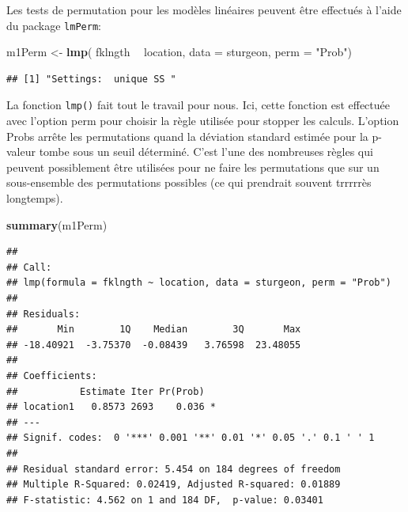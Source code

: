 \documentclass[12pt,]{book}
\newenvironment{Shaded}{\begin{snugshade}}{\end{snugshade}}
\newcommand{\DataTypeTok}[1]{\textcolor[rgb]{0.13,0.29,0.53}{#1}}
\newcommand{\KeywordTok}[1]{\textcolor[rgb]{0.13,0.29,0.53}{\textbf{#1}}}
\newcommand{\NormalTok}[1]{#1}
\newcommand{\OperatorTok}[1]{\textcolor[rgb]{0.81,0.36,0.00}{\textbf{#1}}}
\newcommand{\StringTok}[1]{\textcolor[rgb]{0.31,0.60,0.02}{#1}}
\begin{document}
Les tests de permutation pour les modèles linéaires peuvent être effectués à l'aide du package \texttt{lmPerm}:

\begin{Shaded}
\begin{Highlighting}[]
\NormalTok{m1Perm <-}\StringTok{ }\KeywordTok{lmp}\NormalTok{(}
\NormalTok{  fklngth }\OperatorTok{~}\StringTok{ }\NormalTok{location, }\DataTypeTok{data =}\NormalTok{ sturgeon,}
  \DataTypeTok{perm =} \StringTok{"Prob"}\NormalTok{)}
\end{Highlighting}
\end{Shaded}

\begin{verbatim}
## [1] "Settings:  unique SS "
\end{verbatim}

La fonction \texttt{lmp()} fait tout le travail pour nous. Ici, cette fonction est effectuée avec l'option perm pour choisir la règle utilisée pour stopper les calculs. L'option Probs arrête les permutations quand la déviation standard estimée pour la p-valeur tombe sous un seuil déterminé. C'est l'une des nombreuses règles qui peuvent possiblement être utilisées pour ne faire les permutations que sur un sous-ensemble des permutations possibles (ce qui prendrait souvent trrrrrès longtemps).

\begin{Shaded}
\begin{Highlighting}[]
\KeywordTok{summary}\NormalTok{(m1Perm)}
\end{Highlighting}
\end{Shaded}

\begin{verbatim}
## 
## Call:
## lmp(formula = fklngth ~ location, data = sturgeon, perm = "Prob")
## 
## Residuals:
##       Min        1Q    Median        3Q       Max 
## -18.40921  -3.75370  -0.08439   3.76598  23.48055 
## 
## Coefficients:
##           Estimate Iter Pr(Prob)  
## location1   0.8573 2693    0.036 *
## ---
## Signif. codes:  0 '***' 0.001 '**' 0.01 '*' 0.05 '.' 0.1 ' ' 1
## 
## Residual standard error: 5.454 on 184 degrees of freedom
## Multiple R-Squared: 0.02419, Adjusted R-squared: 0.01889 
## F-statistic: 4.562 on 1 and 184 DF,  p-value: 0.03401
\end{verbatim}
\end{document}
